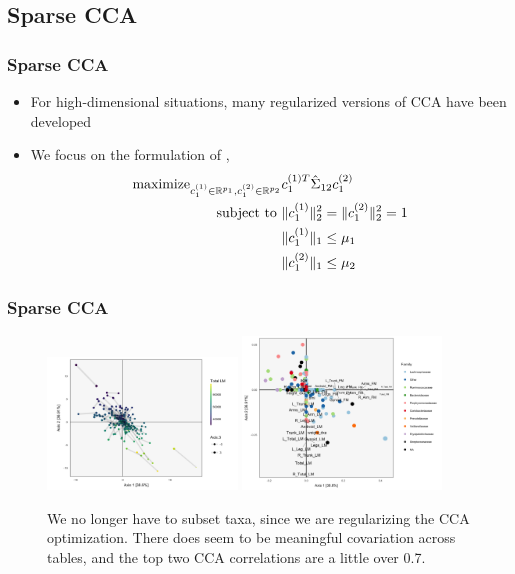 \documentclass{beamer}
\begin{document}
\subsection{Sparse CCA}
\label{subsec:sparse_cca}

\begin{frame}
  \frametitle{Sparse CCA}
  \begin{itemize}
  \item For high-dimensional situations, many regularized versions of CCA have
    been developed \citep{zou2006sparse, witten2009penalized, hardoon2011sparse,
      balakrishnan2012sparse}
  \item We focus on the formulation of \citep{witten2009penalized},
    \begin{align*}
  \text{maximize}_{c_{1}^{(1)} \in \mathbb{R}^{p_{1}}, c_{1}^{(2)} \in
    \mathbb{R}^{p_{2}}} & c_{1}^{(1) T}\hat{\Sigma}_{12}
  c_{1}^{(2)} \\
  \text{subject to } &\|c_{1}^{(1)}\|_{2}^{2} = \|c_{1}^{(2)}\|_{2}^{2} = 1 \\
  &\|c_{1}^{(1)}\|_{1} \leq \mu_{1} \\
  &\|c_{1}^{(2)}\|_{1} \leq \mu_{2}
    \end{align*}
  \end{itemize}
\end{frame}

\begin{frame}
  \frametitle{Sparse CCA}
  \begin{figure}[ht]
    \centering
    \includegraphics[width=0.45\textwidth]{figure/pmd_scores_lm}
    \includegraphics[width=0.47\textwidth]{figure/pmd_loadings}
    \caption{We no longer have to subset taxa, since we are regularizing the CCA
      optimization. There does seem to be meaningful covariation across tables,
      and the top two CCA correlations are a little over
      0.7. \label{fig:pmd_scores}}
  \end{figure}
\end{frame}
\end{document}
